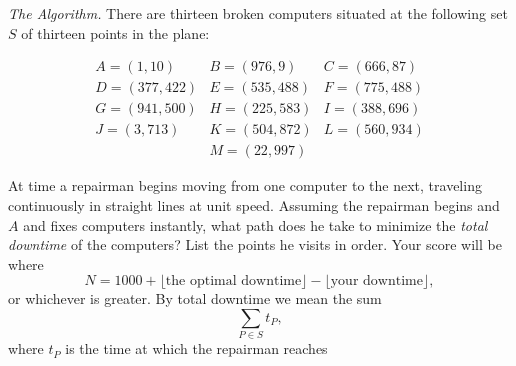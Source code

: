 \textit{The Algorithm.} There are thirteen broken computers situated at the following set $S$ of thirteen points in the plane:

\[\begin{array}{ccc}A=(1,10)&B=(976,9)&C=(666,87)\\D=(377,422)&E=(535,488)&F=(775,488) \\ G=(941,500) & H=(225,583)&I=(388,696)\\J=(3,713)&K=(504,872)&L=(560,934)\\&M=(22,997)&\end{array}\]

At time  a repairman begins moving from one computer to the next, traveling continuously in straight lines at unit speed. Assuming the repairman begins and $A$ and ﬁxes computers instantly, what path does he take to minimize the \textit{total downtime} of the computers?  List the points he visits in order.  Your score will be  where \[N=1000+\lfloor\text{the optimal downtime}\rfloor - \lfloor \text{your downtime}\rfloor ,\] or  whichever is greater.  By total downtime we mean the sum \[\sum_{P\in S}t_P,\] where $t_P$ is the time at which the repairman reaches 